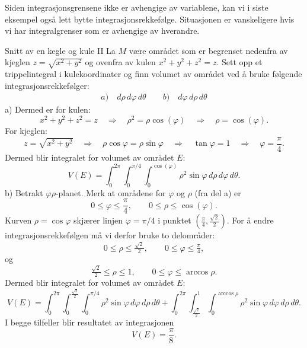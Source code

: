 Siden integrasjonsgrensene ikke er avhengige av variablene, kan vi i siste eksempel også lett bytte integrasjonsrekkefølge. Situasjonen er vanskeligere hvis vi har integralgrenser som er avhengige av hverandre.

\begin{eks}{Snitt av en kegle og kule II}
La $M$ være området som er begrenset nedenfra av kjeglen 
$z = \sqrt{x^{2} + y^{2}}$
og ovenfra av kulen $x^{2} + y^{2} + z^{2} = z$. Sett opp et trippelintegral i kulekoordinater og finn volumet av området ved å bruke følgende integrasjonsrekkefølger:
\begin{align*}
a)\quad d\rho \, d\varphi \, d\theta \qquad b)\quad d\varphi \, d\rho \, d\theta
\end{align*}
a) Dermed er for kulen:
\[
x^{2} + y^{2} + z^{2} = z
\quad \Rightarrow \quad 
\rho^{2} = \rho \cos (\varphi) 
\quad \Rightarrow \quad 
\rho = \cos (\varphi).
\]
For kjeglen:
\[
z = \sqrt{x^{2} + y^{2}}
\quad \Rightarrow \quad 
\rho \cos \varphi = \rho \sin \varphi
\quad \Rightarrow \quad 
\tan \varphi = 1
\quad \Rightarrow \quad 
\varphi = \frac{\pi}{4}.
\]
Dermed blir integralet for volumet av området $E$:
\[
V(E) = \int_{0}^{2\pi} \int_{0}^{\pi/4} \int_{0}^{\cos (\varphi)} 
\rho^{2} \sin \varphi \, d\rho \, d\varphi \, d\theta.
\]
b) Betrakt $\varphi\rho$-planet. Merk at områdene for $\varphi$ og $\rho$ (fra del a) er
\[
0 \leq \varphi \leq \frac{\pi}{4}, 
\qquad 0 \leq \rho \leq \cos (\varphi).
\]
Kurven $\rho = \cos \varphi$ skjærer linjen $\varphi = \pi/4$ i punktet $\left(\tfrac{\pi}{4}, \tfrac{\sqrt{2}}{2}\right)$.
For å endre integrasjonsrekkefølgen må vi derfor bruke to delområder:
\[
0 \leq \rho \leq \tfrac{\sqrt{2}}{2}, 
\qquad 0 \leq \varphi \leq \tfrac{\pi}{4},
\]
og
\[
\tfrac{\sqrt{2}}{2} \leq \rho \leq 1, 
\qquad 0 \leq \varphi \leq \arccos \rho.
\]
Dermed blir integralet for volumet av området $E$:
\[
V(E) = \int_{0}^{2\pi} 
\int_{0}^{\tfrac{\sqrt{2}}{2}} 
\int_{0}^{\pi/4} 
\rho^{2} \sin \varphi \, d\varphi \, d\rho \, d\theta
+ \int_{0}^{2\pi} 
\int_{\tfrac{\sqrt{2}}{2}}^{1} 
\int_{0}^{\arccos \rho} 
\rho^{2} \sin \varphi \, d\varphi \, d\rho \, d\theta.
\]
I begge tilfeller blir resultatet av integrasjonen
\[
V(E) = \frac{\pi}{8}.
\]
\end{eks}

